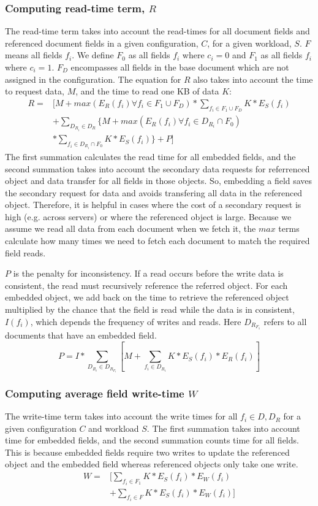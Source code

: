 \subsubsection{Computing read-time term, $R$}
The read-time term takes into account the read-times for all document fields and referenced document fields in a given configuration, $C$, for a given workload, $S$. $F$ means all fields $f_i$. We define $F_0$ as all fields $f_i$ where $c_i = 0$ and $F_1$ as all fields $f_i$ where $c_i = 1$. $F_D$ encompasses all fields in the base document which are not assigned in the configuration. The equation for $R$ also takes into account the time to request data, $M$, and the time to read one KB of data $K$:
\begin{align*}
R =& [M + max(E_R(f_i) \forall f_i \in F_1 \cup F_D)*\sum_{f_i \in F_1 \cup F_D} K*E_S(f_i)\\
& + \sum_{D_{R_i} \in D_R} \{M + max(E_R(f_i) \forall f_i \in D_{R_i} \cap F_0)\\
& * \sum_{f_i \in D_{R_i} \cap F_0} K*E_S(f_i)\} + P]
\end{align*}
The first summation calculates the read time for all embedded fields, and the second summation takes into account the secondary data requests for referrenced object and data transfer for all fields in those objects. So, embedding a field saves the secondary request for data and avoids transfering all data in the referenced object. Therefore, it is helpful in cases where the cost of a secondary request is high (e.g. across servers) or where the referenced object is large. Because we assume we read all data from each document when we fetch it, the $max$ terms calculate how many times we need to fetch each document to match the required field reads.

$P$ is the penalty for inconsistency. If a read occurs before the write data is consistent, the read must recursively reference the referred object. For each embedded object, we add back on the time to retrieve the referenced object multiplied by the chance that the field is read while the data is in consistent, $I(f_i)$, which depends the frequency of writes and reads. Here $D_{R_{F_1}}$ refers to all documents that have an embedded field.
$$P = I*\sum_{D_{R_i} \in D_{R_{F_1}}} [M+\sum_{f_i \in D_{R_i}} K*E_S(f_i)*E_R(f_i)]$$


\subsubsection{Computing average field write-time $W$}
The write-time term takes into account the write times for all $f_i \in D, D_R$ for a given configuration $C$ and workload $S$. The first summation takes into account time for embedded fields, and the second summation counts time for all fields. This is because embedded fields require two writes to update the referenced object and the embedded field whereas referenced objects only take one write.
\begin{align*}
W =& [\sum_{f_i \in F_1} K*E_S(f_i)*E_W(f_i)\\
& + \sum_{f_i \in F} K*E_S(f_i)*E_W(f_i)]
\end{align*}
